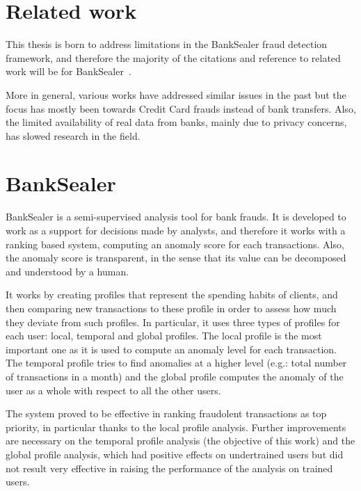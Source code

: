 
\section{Related work}

This thesis is born to address limitations in the BankSealer fraud detection framework, and therefore the majority of the citations and reference to related work will be for BankSealer~\cite{banksealer}.

More in general, various works have addressed similar issues in the past but the focus has mostly been towards Credit Card frauds instead of bank transfers. Also, the limited availability of real data from banks, mainly due to privacy concerns, has slowed research in the field.

\section{BankSealer}

BankSealer is a semi-supervised analysis tool for bank frauds. It is developed to work as a support for decisions made by analysts, and therefore it works with a ranking based system, computing an anomaly score for each transactions. Also, the anomaly score is transparent, in the sense that its value can be decomposed and understood by a human.

It works by creating profiles that represent the spending habits of clients, and then comparing new transactions to these profile in order to assess how much they deviate from such profiles. In particular, it uses three types of profiles for each user: local, temporal and global profiles. The local profile is the most important one as it is used to compute an anomaly level for each transaction. The temporal profile tries to find anomalies at a higher level (e.g.: total number of transactions in a month) and the global profile computes the anomaly of the user as a whole with respect to all the other users.

The system proved to be effective in ranking fraudolent transactions as top priority, in particular thanks to the local profile analysis. Further improvements are necessary on the temporal profile analysis (the objective of this work) and the global profile analysis, which had positive effects on undertrained users but did not result very effective in raising the performance of the analysis on trained users.
